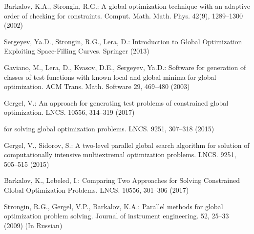 \documentclass[smallextended]{svjour3}       %
\begin{document}
\begin{thebibliography}{}
Barkalov, K.A., Strongin, R.G.: A global optimization technique with an adaptive order of 
checking for constraints. Comput. Math. Math. Phys. 42(9), 1289--1300 (2002)

Sergeyev, Ya.D., Strongin, R.G., Lera, D.: Introduction to Global Optimization Exploiting 
Space-Filling Curves. Springer (2013)

Gaviano, M., Lera, D., Kvasov, D.E., Sergeyev, Ya.D.: Software for generation of classes of 
test functions with known local and global minima for global optimization. ACM Trans. Math. 
Software 29, 469--480 (2003)

Gergel, V.: An approach for generating test problems of constrained global optimization. 
LNCS. 10556, 314--319 (2017)

for solving global optimization problems. LNCS. 9251, 307--318 (2015)

Gergel, V., Sidorov, S.: A two-level parallel global search algorithm for solution of 
computationally intensive multiextremal optimization problems. LNCS. 9251, 505--515 (2015)

Barkalov, K., Lebeled, I.: Comparing Two Approaches for Solving Constrained Global 
Optimization Problems. LNCS. 10556, 301--306 (2017)

Strongin, R.G., Gergel, V.P., Barkalov, K.A.: Parallel methods for global optimization problem 
solving. Journal of instrument engineering. 52, 25--33 (2009) (In Russian)



%
\end{thebibliography}
\end{document}
